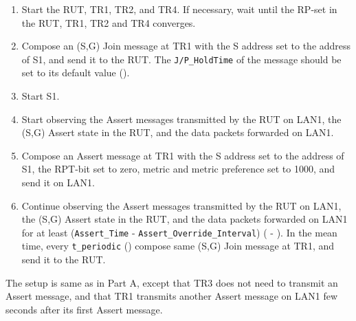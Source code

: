 \documentclass[11pt]{report}
\begin{document}

\begin{enumerate}

  \item Start the RUT, TR1, TR2, and TR4. If necessary, wait until the RP-set
  in the RUT, TR1, TR2 and TR4 converges.

  \item Compose an (S,G) Join message at TR1 with the S address set to the
  address of S1, and send it to the RUT.
  The \verb=J/P_HoldTime= of the message should be set to its default
  value ({\PimsmJPHoldTime}).

  \item Start S1.

  \item Start observing the Assert messages transmitted by the RUT on
  LAN1, the (S,G) Assert state in the RUT, and the data packets forwarded on
  LAN1.

  \item Compose an Assert message at TR1 with the S address set to the
  address of S1, the RPT-bit set to zero, metric and metric preference set to
  1000, and send it on LAN1.

  \item Continue observing the Assert messages transmitted by the RUT on
  LAN1, the (S,G) Assert state in the RUT, and the data packets forwarded on
  LAN1 for at least \newline
  (\verb=Assert_Time= - \verb=Assert_Override_Interval=)
  ({\PimsmAssertTime} - {\PimsmAssertOverrideInterval}).
  In the mean time, every \verb=t_periodic= ({\PimsmTPeriodic}) compose same
  (S,G) Join message at TR1, and send it to the RUT.

\end{enumerate}


The setup is same as in Part A, except that TR3 does not need to transmit an
Assert message, and that TR1 transmits another Assert
message on LAN1 few seconds after its first Assert message.

\end{document}

